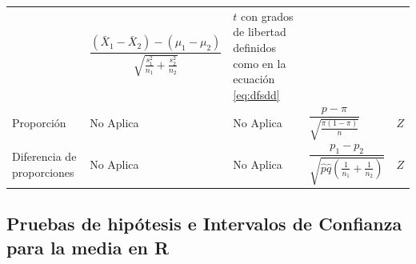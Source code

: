 \documentclass[]{book}
\begin{document}
\begin{longtable}[]{@{}lllll@{}}
\begin{minipage}[t]{0.05\columnwidth}
\end{minipage} & \begin{minipage}[t]{0.05\columnwidth}\raggedright\strut
\(\dfrac{\left( \bar{X}_1-\bar{X}_2 \right)- \left(\mu_1 - \mu_2 \right)}{\sqrt{\frac{s^2_1}{n_1}+ \frac{s_2^2}{n_2} }}\)\strut
\end{minipage} & \begin{minipage}[t]{0.05\columnwidth}\raggedright\strut
\(t\) con grados de libertad definidos como en la ecuación
\eqref{eq:dfsdd}\strut
\end{minipage}\tabularnewline
\begin{minipage}[t]{0.05\columnwidth}\raggedright\strut
Proporción\strut
\end{minipage} & \begin{minipage}[t]{0.05\columnwidth}\raggedright\strut
No Aplica\strut
\end{minipage} & \begin{minipage}[t]{0.05\columnwidth}\raggedright\strut
No Aplica\strut
\end{minipage} & \begin{minipage}[t]{0.05\columnwidth}\raggedright\strut
\(\dfrac{p-\pi}{\sqrt{\frac{\pi\left(1-\pi\right)}{n}}}\)\strut
\end{minipage} & \begin{minipage}[t]{0.05\columnwidth}\raggedright\strut
\(Z\)\strut
\end{minipage}\tabularnewline
\begin{minipage}[t]{0.05\columnwidth}\raggedright\strut
Diferencia de proporciones\strut
\end{minipage} & \begin{minipage}[t]{0.05\columnwidth}\raggedright\strut
No Aplica\strut
\end{minipage} & \begin{minipage}[t]{0.05\columnwidth}\raggedright\strut
No Aplica\strut
\end{minipage} & \begin{minipage}[t]{0.05\columnwidth}\raggedright\strut
\(\dfrac{p_1-p_2}{\sqrt{\hat{p}\hat{q}\left(\frac{1}{n_1}+\frac{1}{n_2}\right)}}\)\strut
\end{minipage} & \begin{minipage}[t]{0.05\columnwidth}\raggedright\strut
\(Z\)\strut
\end{minipage}\tabularnewline
\bottomrule
\end{longtable}

\subsection{Pruebas de hipótesis e Intervalos de Confianza para la media
en
R}\label{pruebas-de-hipotesis-e-intervalos-de-confianza-para-la-media-en-r}
\end{document}

